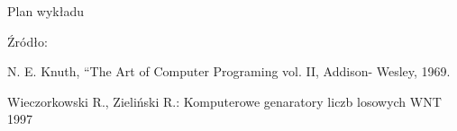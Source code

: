 

\usepackage{amsmath}
\usepackage{mathtools}
\usepackage{setspace}
\usepackage{scrextend}
\usepackage{listings}

\subtitle{Liczby losowe (random numbers)}

	

	\maketitle
	\begin{frame}{Plan wykładu}
		\tableofcontents
	\end{frame}
	
	
	
	
	
	
	

\begin{frame}
		Źródło:

		N. E. Knuth, ``The Art of Computer Programing vol. II, Addison- Wesley, 1969.


		 Wieczorkowski R., Zieliński R.: Komputerowe genaratory liczb losowych WNT 1997
\end{frame}


\grid
